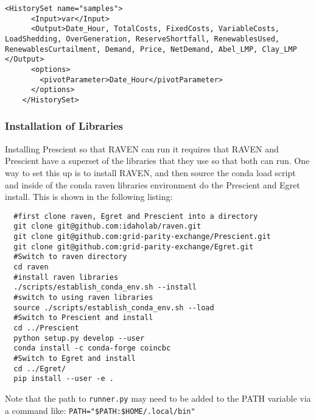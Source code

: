 \begin{lstlisting}[style=XML]
    <HistorySet name="samples">
      <Input>var</Input>
      <Output>Date_Hour, TotalCosts, FixedCosts, VariableCosts, LoadShedding, OverGeneration, ReserveShortfall, RenewablesUsed, RenewablesCurtailment, Demand, Price, NetDemand, Abel_LMP, Clay_LMP </Output>
      <options>
        <pivotParameter>Date_Hour</pivotParameter>
      </options>
    </HistorySet>
\end{lstlisting}


\subsubsection{Installation of Libraries}

Installing Prescient so that RAVEN can run it requires that RAVEN and
Prescient have a superset of the libraries that they use so that both
can run.  One way to set this up is to install RAVEN, and then source
the conda load script and inside of the conda raven libraries
environment do the Prescient and Egret install.  This is shown in the
following listing:

\begin{lstlisting}
  #first clone raven, Egret and Prescient into a directory
  git clone git@github.com:idaholab/raven.git
  git clone git@github.com:grid-parity-exchange/Prescient.git
  git clone git@github.com:grid-parity-exchange/Egret.git
  #Switch to raven directory
  cd raven
  #install raven libraries
  ./scripts/establish_conda_env.sh --install
  #switch to using raven libraries
  source ./scripts/establish_conda_env.sh --load
  #Switch to Prescient and install
  cd ../Prescient
  python setup.py develop --user
  conda install -c conda-forge coincbc
  #Switch to Egret and install
  cd ../Egret/
  pip install --user -e .
\end{lstlisting}

Note that the path to \texttt{runner.py} may need to be added to the PATH variable via a command like: \verb'PATH="$PATH:$HOME/.local/bin"'
